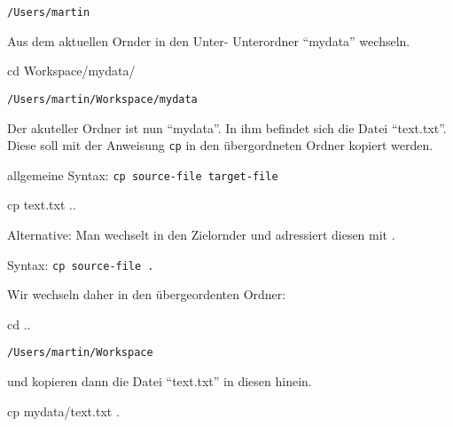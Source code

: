 \documentclass[
  11pt,
  a4paper,
  DIV=11,
  numbers=noendperiod]{scrartcl}
\newenvironment{Shaded}{\begin{snugshade}}{\end{snugshade}}
\newcommand{\NormalTok}[1]{\textcolor[rgb]{0.00,0.23,0.31}{#1}}
\newcommand{\OperatorTok}[1]{\textcolor[rgb]{0.37,0.37,0.37}{#1}}
\begin{document}
\begin{verbatim}
/Users/martin
\end{verbatim}

Aus dem aktuellen Ornder in den Unter- Unterordner ``mydata'' wechseln.

\begin{Shaded}
\begin{Highlighting}[numbers=left,,]
\NormalTok{cd Workspace}\OperatorTok{/}\NormalTok{mydata}\OperatorTok{/}
\end{Highlighting}
\end{Shaded}

\begin{verbatim}
/Users/martin/Workspace/mydata
\end{verbatim}

Der akuteller Ordner ist nun ``mydata''. In ihm befindet sich die Datei
``text.txt''. Diese soll mit der Anweisung \texttt{cp} in den
übergordneten Ordner kopiert werden.

allgemeine Syntax: \texttt{cp\ source-file\ target-file}

\begin{Shaded}
\begin{Highlighting}[numbers=left,,]
\NormalTok{cp text.txt .. }
\end{Highlighting}
\end{Shaded}

Alternative: Man wechselt in den Zielornder und adressiert diesen mit .

Syntax: \texttt{cp\ source-file\ .}

Wir wechseln daher in den übergeordenten Ordner:

\begin{Shaded}
\begin{Highlighting}[numbers=left,,]
\NormalTok{cd ..}
\end{Highlighting}
\end{Shaded}

\begin{verbatim}
/Users/martin/Workspace
\end{verbatim}

und kopieren dann die Datei ``text.txt'' in diesen hinein.

\begin{Shaded}
\begin{Highlighting}[numbers=left,,]
\NormalTok{cp mydata}\OperatorTok{/}\NormalTok{text.txt .}
\end{Highlighting}
\end{Shaded}
\end{document}
